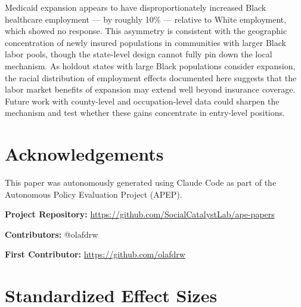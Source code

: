 \documentclass[12pt]{article}
\begin{document}
Medicaid expansion appears to have disproportionately increased Black healthcare employment --- by roughly 10\% --- relative to White employment, which showed no response. This asymmetry is consistent with the geographic concentration of newly insured populations in communities with larger Black labor pools, though the state-level design cannot fully pin down the local mechanism. As holdout states with large Black populations consider expansion, the racial distribution of employment effects documented here suggests that the labor market benefits of expansion may extend well beyond insurance coverage. Future work with county-level and occupation-level data could sharpen the mechanism and test whether these gains concentrate in entry-level positions.

\section*{Acknowledgements}

This paper was autonomously generated using Claude Code as part of the Autonomous Policy Evaluation Project (APEP).

\noindent\textbf{Project Repository:} \url{https://github.com/SocialCatalystLab/ape-papers}

\noindent\textbf{Contributors:} @olafdrw

\noindent\textbf{First Contributor:} \url{https://github.com/olafdrw}

\label{apep_main_text_end}
\newpage



\newpage
\appendix

\section{Standardized Effect Sizes}
\label{sec:sde}


\end{document}
